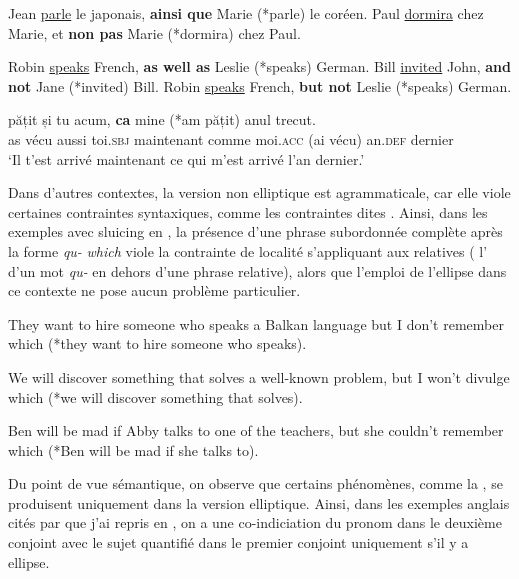 \ea \label{ch1:ex1}
\ea  Jean \uline{parle} le japonais, \textbf{ainsi que} Marie (*parle) le coréen.\label{ch1:ex1a}
\ex  Paul \uline{dormira} chez Marie, et \textbf{non pas} Marie (*dormira) chez Paul.\label{ch1:ex1b}
\z
\z

\ea \label{ch1:ex2}
\ea  Robin \uline{speaks} French, \textbf{as well as} Leslie (*speaks) German.\label{ch1:ex2a}
\ex  Bill \uline{invited} John, \textbf{and not} Jane (*invited) Bill.\label{ch1:ex2b}
\ex  Robin \uline{speaks} French, \textbf{but not} Leslie (*speaks) German.\label{ch1:ex2c}
\z
\z

\ea \label{ch1:ex3}
\gll {} pățit și tu acum, \textbf{ca}  mine (*am  pățit) anul trecut.\\
as  vécu  aussi  toi.\textsc{sbj}  maintenant  comme  moi.\textsc{acc}  (ai  vécu)  an.\textsc{def} dernier\\
\glt ‘Il t’est arrivé maintenant ce qui m’est arrivé l’an dernier.’ 
\z

Dans d’autres contextes, la version non elliptique est agrammaticale, car elle viole certaines contraintes syntaxiques, comme les contraintes dites . Ainsi, dans les exemples avec sluicing en , la présence d’une phrase subordonnée complète après la forme \textit{qu-} \textit{which} viole la contrainte de localité s’appliquant aux relatives ({\cad} l’ d’un mot \textit{qu-} en dehors d’une phrase relative), alors que l’emploi de l’ellipse dans ce contexte ne pose aucun problème particulier.

\ea \label{ch1:ex4}
\ea  They want to hire someone who speaks a Balkan language but I don’t remember which (*they want to hire someone who speaks). \citep[5]{Merchant2001}

\ex  We will discover something that solves a well-known problem, but I won’t divulge which (*we will discover something that solves). \citep[2]{Johnson2008}

\ex  Ben will be mad if Abby talks to one of the teachers, but she couldn’t remember which (*Ben will be mad if she talks to). \citep[136]{Merchant2008b}
\z
\z

Du point de vue sémantique, on observe que certains phénomènes, comme la , se produisent uniquement dans la version elliptique. Ainsi, dans les exemples anglais cités par \citet{Johnson1996/2004,Johnson2000,Johnson2009} que j’ai repris en , on a une co-indiciation du pronom dans le deuxième conjoint avec le sujet quantifié dans le premier conjoint uniquement s’il y a ellipse.

